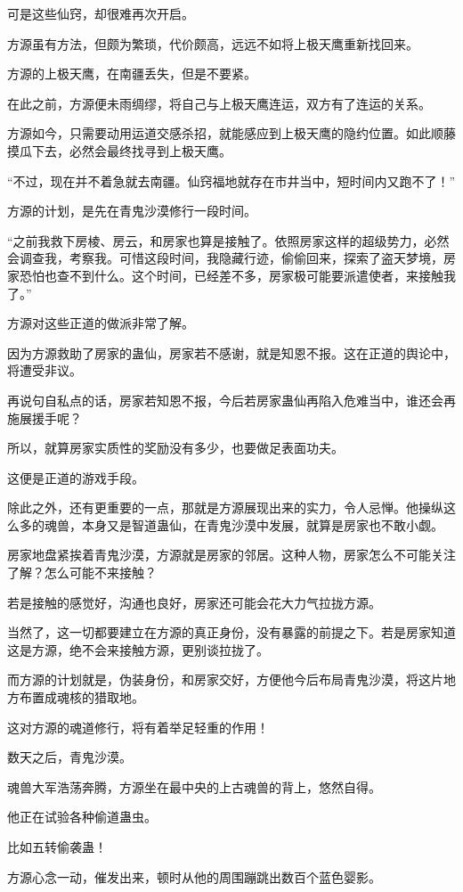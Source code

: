 \begin{this_body}
可是这些仙窍，却很难再次开启。

方源虽有方法，但颇为繁琐，代价颇高，远远不如将上极天鹰重新找回来。

方源的上极天鹰，在南疆丢失，但是不要紧。

在此之前，方源便未雨绸缪，将自己与上极天鹰连运，双方有了连运的关系。

方源如今，只需要动用运道交感杀招，就能感应到上极天鹰的隐约位置。如此顺藤摸瓜下去，必然会最终找寻到上极天鹰。

“不过，现在并不着急就去南疆。仙窍福地就存在市井当中，短时间内又跑不了！”

方源的计划，是先在青鬼沙漠修行一段时间。

“之前我救下房棱、房云，和房家也算是接触了。依照房家这样的超级势力，必然会调查我，考察我。可惜这段时间，我隐藏行迹，偷偷回来，探索了盗天梦境，房家恐怕也查不到什么。这个时间，已经差不多，房家极可能要派遣使者，来接触我了。”

方源对这些正道的做派非常了解。

因为方源救助了房家的蛊仙，房家若不感谢，就是知恩不报。这在正道的舆论中，将遭受非议。

再说句自私点的话，房家若知恩不报，今后若房家蛊仙再陷入危难当中，谁还会再施展援手呢？

所以，就算房家实质性的奖励没有多少，也要做足表面功夫。

这便是正道的游戏手段。

除此之外，还有更重要的一点，那就是方源展现出来的实力，令人忌惮。他操纵这么多的魂兽，本身又是智道蛊仙，在青鬼沙漠中发展，就算是房家也不敢小觑。

房家地盘紧挨着青鬼沙漠，方源就是房家的邻居。这种人物，房家怎么不可能关注了解？怎么可能不来接触？

若是接触的感觉好，沟通也良好，房家还可能会花大力气拉拢方源。

当然了，这一切都要建立在方源的真正身份，没有暴露的前提之下。若是房家知道这是方源，绝不会来接触方源，更别谈拉拢了。

而方源的计划就是，伪装身份，和房家交好，方便他今后布局青鬼沙漠，将这片地方布置成魂核的猎取地。

这对方源的魂道修行，将有着举足轻重的作用！

数天之后，青鬼沙漠。

魂兽大军浩荡奔腾，方源坐在最中央的上古魂兽的背上，悠然自得。

他正在试验各种偷道蛊虫。

比如五转偷袭蛊！

方源心念一动，催发出来，顿时从他的周围蹦跳出数百个蓝色婴影。


\end{this_body}
